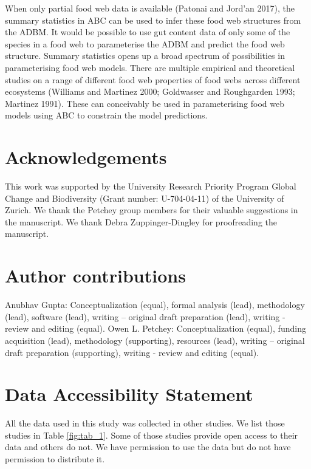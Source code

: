 \documentclass{article}
\begin{document}
When only partial food web data is available (Patonai and Jord'an 2017),
the summary statistics in ABC can be used to infer these food web
structures from the ADBM. It would be possible to use gut content data
of only some of the species in a food web to parameterise the ADBM and
predict the food web structure. Summary statistics opens up a broad
spectrum of possibilities in parameterising food web models. There are
multiple empirical and theoretical studies on a range of different food
web properties of food webs across different ecosystems (Williams and
Martinez 2000; Goldwasser and Roughgarden 1993; Martinez 1991). These
can conceivably be used in parameterising food web models using ABC to
constrain the model predictions.

\hypertarget{acknowledgements}{%
\section{Acknowledgements}\label{acknowledgements}}

This work was supported by the University Research Priority Program
Global Change and Biodiversity (Grant number: U-704-04-11) of the
University of Zurich. We thank the Petchey group members for their
valuable suggestions in the manuscript. We thank Debra Zuppinger-Dingley
for proofreading the manuscript.

\hypertarget{author-contributions}{%
\section{Author contributions}\label{author-contributions}}

Anubhav Gupta: Conceptualization (equal), formal analysis (lead),
methodology (lead), software (lead), writing -- original draft
preparation (lead), writing - review and editing (equal). Owen L.
Petchey: Conceptualization (equal), funding acquisition (lead),
methodology (supporting), resources (lead), writing -- original draft
preparation (supporting), writing - review and editing (equal).

\hypertarget{data-accessibility-statement}{%
\section{Data Accessibility
Statement}\label{data-accessibility-statement}}

All the data used in this study was collected in other studies. We list
those studies in Table \ref{fig:tab_1}. Some of those studies provide
open access to their data and others do not. We have permission to use
the data but do not have permission to distribute it.
\end{document}
